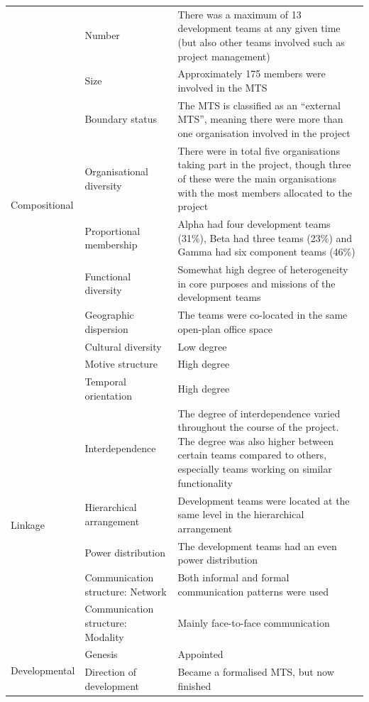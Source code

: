 \begin{center}
\begin{longtable}{ | p{2.25cm} | p{2.25cm} | p{6.5cm} | }
	\multirow{10}{*}{Compositional} & Number & There was a maximum of 13 development teams at any given time (but also other teams involved such as project management) \\ \cline{2-3}
 	& Size & Approximately 175 members were involved in the MTS \\ \cline{2-3}
 	& Boundary status & The MTS is classified as an ``external MTS'', meaning there were more than one organisation involved in the project \\ \cline{2-3}
 	& Organisational diversity & There were in total five organisations taking part in the project, though three of these were the main organisations with the most members allocated to the project \\ \cline{2-3}
	& Proportional membership & Alpha had four development teams (31\%), Beta had three teams (23\%) and Gamma had six component teams (46\%) \\ \cline{2-3}
	& Functional diversity & Somewhat high degree of heterogeneity in core purposes and missions of the development teams \\ \cline{2-3}
	& Geographic dispersion & The teams were co-located in the same open-plan office space \\ \cline{2-3}
	& Cultural diversity & Low degree \\ \cline{2-3}
	& Motive structure & High degree \\ \cline{2-3}
	& Temporal orientation & High degree \\ \cline{2-3}
\hline
	\multirow{5}{*}{Linkage} & Interdependence & The degree of interdependence varied throughout the course of the project. The degree was also higher between certain teams compared to others, especially teams working on similar functionality \\ \cline{2-3}
 	& Hierarchical arrangement & Development teams were located at the same level in the hierarchical arrangement \\ \cline{2-3}
 	& Power distribution & The development teams had an even power distribution \\ \cline{2-3}
	& Communication structure: Network & Both informal and formal communication patterns were used \\ \cline{2-3}
	& Communication structure: Modality & Mainly face-to-face communication \\ \cline{2-3}
\hline
	\multirow{6}{*}{Developmental} & Genesis & Appointed \\ \cline{2-3}
 	& Direction of development & Became a formalised MTS, but now finished \\ \cline{2-3}

\end{longtable}
\end{center}
